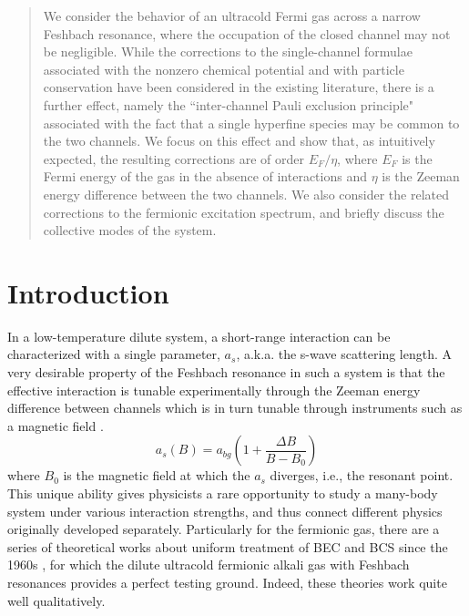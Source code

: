 \documentclass[reprint,pra]{revtex4-1}
\newcommand{\br}[1]{\ensuremath{\left(#1\right)}}
\begin{document}
\begin{abstract}
We consider the behavior of an ultracold Fermi gas across a narrow
Feshbach resonance, where the occupation of the closed channel may not be
negligible. While the corrections to the single-channel formulae associated
with the nonzero chemical potential and with particle conservation have
been considered in the existing literature, there is a further effect, namely the
``inter-channel Pauli exclusion principle" associated with the fact that
a single hyperfine species may be common to the two channels. We focus on
this effect and show that, as intuitively expected, the resulting
corrections are of order $E_F/\eta$, where $E_F$ is the Fermi energy of the gas
in the absence of interactions and $\eta$ is the Zeeman energy difference
between the two channels. We also consider the related corrections
to the fermionic excitation spectrum, and briefly discuss the collective
modes of the system.
\end{abstract}
\maketitle


\section{Introduction}

In a low-temperature dilute system, a short-range interaction can be characterized with a single parameter, $a_s$, a.k.a. the s-wave scattering length.    A very desirable property of the Feshbach resonance in such a system is that the effective interaction is tunable experimentally through the Zeeman energy difference between channels which is in turn  tunable through  instruments such as a magnetic field  \cite{Fano,nuclear,ChinRMP,Pethick}. 
 \begin{equation}
a_{s}(B)=a_{bg}\br{1+\frac{\Delta{B}}{B-B_{0}}}
\end{equation}
where $B_{0}$ is the magnetic field at which the $a_{s}$ diverges, i.e., the  resonant point. 
This unique ability gives physicists a rare opportunity to study  a many-body system under various interaction strengths,  and thus connect different physics originally developed separately.  Particularly for the fermionic gas, there are a series of  theoretical works about uniform treatment of  BEC and BCS since the 1960s \cite{Eagle,LeggettCrossover,Nozieres,RanderiaBEC}, for which the dilute ultracold fermionic alkali gas with  Feshbach resonances provides a perfect testing ground.  Indeed,  these theories work quite well  qualitatively.  
\end{document}
